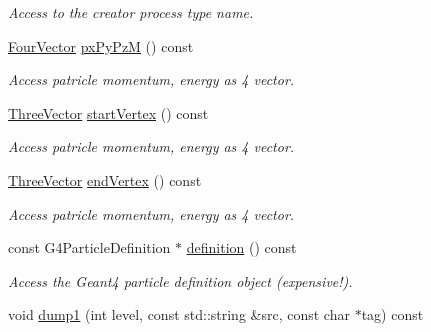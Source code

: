 \begin{DoxyCompactItemize}
\begin{DoxyCompactList}\small\item\em Access to the creator process type name. \item\end{DoxyCompactList}\item 
\hyperlink{class_d_d4hep_1_1_simulation_1_1_geant4_particle_handle_a79648f819b70d2f741fd1a5e19dc2f23}{FourVector} \hyperlink{class_d_d4hep_1_1_simulation_1_1_geant4_particle_handle_a72503948f5442a6cd160880e173f2889}{pxPyPzM} () const 
\begin{DoxyCompactList}\small\item\em Access patricle momentum, energy as 4 vector. \item\end{DoxyCompactList}\item 
\hyperlink{class_d_d4hep_1_1_simulation_1_1_geant4_particle_handle_a8aabe9ad3397b25aae653c42ec82021a}{ThreeVector} \hyperlink{class_d_d4hep_1_1_simulation_1_1_geant4_particle_handle_a04c1d0f57ad6792a18bf7baec527ea13}{startVertex} () const 
\begin{DoxyCompactList}\small\item\em Access patricle momentum, energy as 4 vector. \item\end{DoxyCompactList}\item 
\hyperlink{class_d_d4hep_1_1_simulation_1_1_geant4_particle_handle_a8aabe9ad3397b25aae653c42ec82021a}{ThreeVector} \hyperlink{class_d_d4hep_1_1_simulation_1_1_geant4_particle_handle_a147c27b19dc8ef86584ddcad799538c3}{endVertex} () const 
\begin{DoxyCompactList}\small\item\em Access patricle momentum, energy as 4 vector. \item\end{DoxyCompactList}\item 
const G4ParticleDefinition $\ast$ \hyperlink{class_d_d4hep_1_1_simulation_1_1_geant4_particle_handle_a25bb58ad5ed2c58dddfcd0b6186dbed3}{definition} () const 
\begin{DoxyCompactList}\small\item\em Access the Geant4 particle definition object (expensive!). \item\end{DoxyCompactList}\item 
void \hyperlink{class_d_d4hep_1_1_simulation_1_1_geant4_particle_handle_a2183fca2acd9c08d09c39f405c54c031}{dump1} (int level, const std::string \&src, const char $\ast$tag) const 

\end{DoxyCompactItemize}
